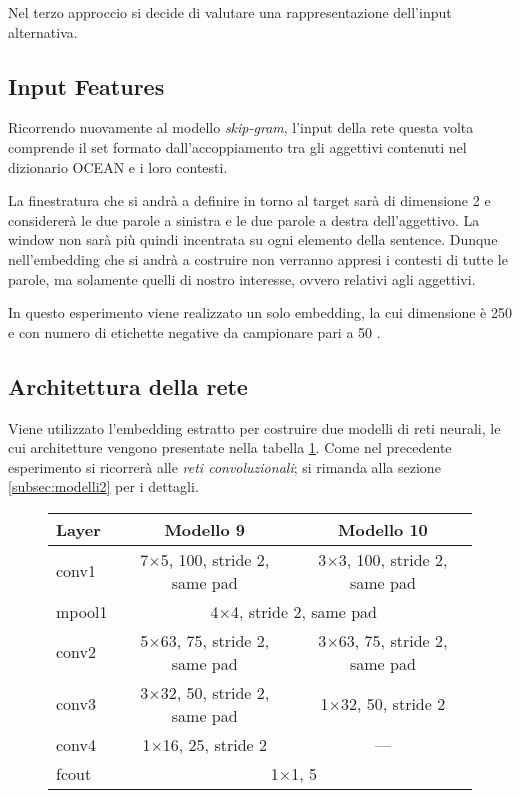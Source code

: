 Nel terzo approccio si decide di valutare una rappresentazione dell'input alternativa.

\subsection{Input Features}
\label{subsec:features3}

Ricorrendo nuovamente al modello \emph{skip-gram}, l'input della rete questa volta comprende il set formato dall'accoppiamento tra gli aggettivi contenuti nel dizionario OCEAN e i loro contesti.

La finestratura che si andrà a definire in torno al target sarà di dimensione 2 e considererà le due parole a sinistra e le due parole a destra dell'aggettivo. La window non sarà più quindi incentrata su ogni elemento della sentence.
Dunque nell'embedding che si andrà a costruire non verranno appresi i contesti di tutte le parole, ma solamente quelli di nostro interesse, ovvero relativi agli aggettivi.

In questo esperimento viene realizzato un solo embedding, la cui dimensione è \num{250} e con numero di etichette negative da campionare pari a 50 \cite{liu2016classification}.

\subsection{Architettura della rete}
\label{subsec:modelli3}

Viene utilizzato l'embedding estratto per costruire due modelli di reti neurali, le cui architetture vengono presentate nella tabella \ref{tab:netemb3}.
Come nel precedente esperimento si ricorrerà alle \emph{reti convoluzionali}; si rimanda alla sezione \ref{subsec:modelli2} per i dettagli. 

\begin{figure}[H]
	\centering
	\begin{tabular}{lcc}
		\toprule
		\textbf{Layer}& \textbf{Modello 9} & \textbf{Modello 10}	\\ 
		\midrule
		conv1   & \num{7}$\times$\num{5}, 100, stride 2, same pad    		&\num{3}$\times$\num{3}, 100, stride 2, same pad 		   \\
		mpool1 	&\multicolumn{2}{c}{\num{4}$\times$\num{4}, stride 2, same pad}	 \\
		conv2  	&  \num{5}$\times$\num{63}, 75, stride 2, same pad	    &		\num{3}$\times$\num{63}, 75, stride 2, same pad    \\
		conv3  	& \num{3}$\times$\num{32}, 50, stride 2, same pad 	   	&	\num{1}$\times$\num{32}, 50, stride 2 	   \\
		conv4  	& \num{1}$\times$\num{16}, 25, stride 2 	   	&	--- 	   \\
		fcout	&\multicolumn{2}{c}{\num{1}$\times$\num{1}, 5}						\\
		
		\bottomrule	
	\end{tabular}
	\label{tab:netemb3}
\end{figure}

